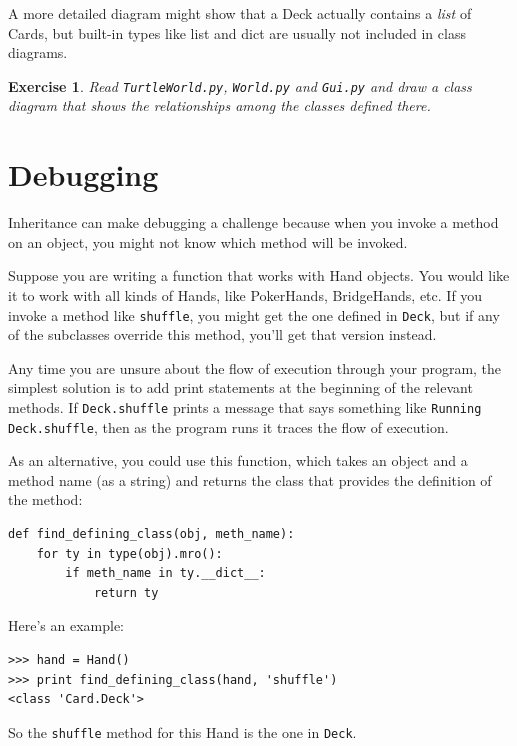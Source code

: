 \documentclass[12pt,a4paper,final,twoside,onecolumn,titlepage]{book}
\newtheorem{exercise}{Exercise}[chapter]
\begin{document}
A more detailed diagram might show that a Deck actually
contains a {\em list} of Cards, but built-in types
like list and dict are usually not included in class diagrams.

\begin{exercise}

Read {\tt TurtleWorld.py}, {\tt World.py} and {\tt Gui.py}
and draw a class diagram that shows the relationships among
the classes defined there.

\end{exercise}


\section{Debugging}

Inheritance can make debugging a challenge because when you
invoke a method on an object, you might not know which method
will be invoked.

Suppose you are writing a function that works with Hand objects.
You would like it to work with all kinds of Hands, like
PokerHands, BridgeHands, etc.  If you invoke a method like
{\tt shuffle}, you might get the one defined in {\tt Deck},
but if any of the subclasses override this method, you'll
get that version instead.  

Any time you are unsure about the flow of execution through your
program, the simplest solution is to add print statements at the
beginning of the relevant methods.  If {\tt Deck.shuffle} prints a
message that says something like {\tt Running Deck.shuffle}, then as
the program runs it traces the flow of execution.

As an alternative, you could use this function, which takes an
object and a method name (as a string) and returns the class that
provides the definition of the method:

\begin{verbatim}
def find_defining_class(obj, meth_name):
    for ty in type(obj).mro():
        if meth_name in ty.__dict__:
            return ty
\end{verbatim}
%
Here's an example:

\begin{verbatim}
>>> hand = Hand()
>>> print find_defining_class(hand, 'shuffle')
<class 'Card.Deck'>
\end{verbatim}
%
So the {\tt shuffle} method for this Hand is the one in {\tt Deck}.
\end{document}
